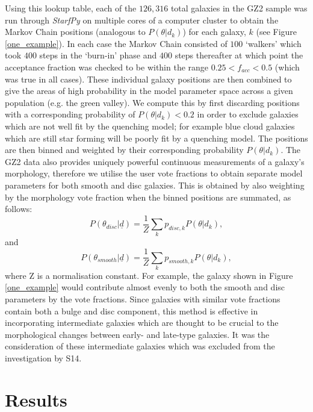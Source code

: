 \documentclass[useAMS,usenatbib]{mn2e}
\begin{document}
{Using this lookup table, each of the $126,316$ total galaxies in the GZ2 sample was run through \emph{StarfPy} on multiple cores of a computer cluster to obtain the Markov Chain positions (analogous to $P(\theta|d_k)$) for each galaxy, $k$ (see Figure \ref{one_example}). In each case the Markov Chain consisted of $100$ `walkers' which took $400$ steps in the `burn-in' phase and $400$ steps thereafter at which point the acceptance fraction was checked to be within the range $0.25 < f_{acc} < 0.5$ (which was true in all cases). These individual galaxy positions are then combined to give the areas of high probability in the model parameter space across a given population (e.g. the green valley). We compute this by first discarding positions with a corresponding probability of $P(\theta|d_k) < 0.2$ in order to exclude galaxies which are not well fit by the quenching model; for example blue cloud galaxies which are still star forming will be poorly fit by a quenching model. The positions are then binned and weighted by their corresponding probability $P(\theta|d_k)$. The GZ2 data also provides uniquely powerful continuous measurements of a galaxy's morphology, therefore we utilise the user vote fractions to obtain separate model parameters for both smooth and disc galaxies. This is obtained by also weighting by the morphology vote fraction when the binned positions are summated, as follows:
\begin{equation}\label{sum}
P(\theta_{disc} | \underline{d}) = \frac{1}{Z} \sum_k p_{disc, k} P(\theta|d_k),
\end{equation}
and
\begin{equation}\label{sum2}
P(\theta_{smooth} | \underline{d}) = \frac{1}{Z} \sum_k p_{smooth, k} P(\theta|d_k), 
\end{equation}
where Z is a normalisation constant. For example, the galaxy shown in Figure \ref{one_example} would contribute almost evenly to both the smooth and disc parameters by the vote fractions. Since galaxies with similar vote fractions contain both a bulge and disc component, this method is effective in incorporating intermediate galaxies which are thought to be crucial to the morphological changes between early- and late-type galaxies. It was the consideration of these intermediate galaxies which was excluded from the investigation by S14.}


\section{Results}\label{results}
\end{document}
